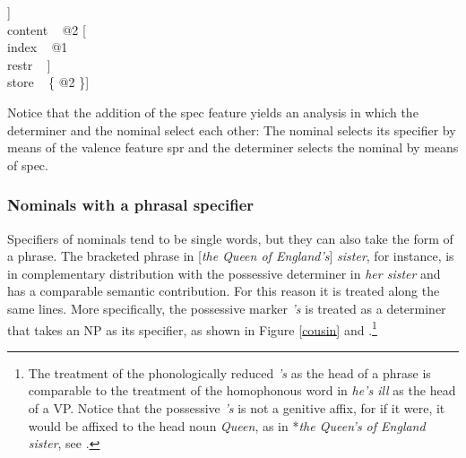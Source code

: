 \documentclass[output=paper]{langsci/langscibook}
\begin{document}
\begin{exe} 
\ex\label{every} 
\begin{avm}
[cat|head [\type{det}               \\
           spec [\type{parameter}   \\
                 index ~ @1          \\
                 restr ~ \avmbox{$\Sigma$} ]] \\
 content ~ @2 [     \\
               index ~ @1            \\
               restr ~ \avmbox{$\Sigma$} ] \\
 store ~ \{ @2 \}]
\end{avm}
\end{exe}

\noindent 
Notice that the addition of the {\sc spec} feature yields an analysis in which the determiner 
and the nominal select each other: The nominal selects 
its specifier by means of the valence feature {\sc spr} and the determiner selects the nominal 
by means of {\sc spec}.  


\subsubsection{Nominals with a phrasal specifier} 


Specifiers of nominals tend to be single words, but they can also take the form 
of a phrase. The bracketed phrase in [\emph{the Queen of England's}] \emph{sister},
for instance, is in complementary distribution with the possessive
determiner in \emph{her sister} and has a comparable semantic contribution.   
For this reason it is treated along the same lines. More specifically, the 
possessive marker \emph{'s} is treated as a determiner that takes an NP as its specifier, 
as shown in Figure \ref{cousin} \citep[51--54]{ps2} and \citep[193]{GS00}.\footnote{The treatment 
of the phonologically reduced \emph{'s} as the head of a phrase is comparable to 
the treatment of the homophonous word in \emph{he's ill} as the head of a VP.
Notice that the possessive \emph{'s} is not a genitive affix, for if it were, it 
would be affixed to the head noun \emph{Queen}, as in *\emph{the Queen's of England sister}, see  
\citet[199]{SagWasow03}.}
\end{document}
